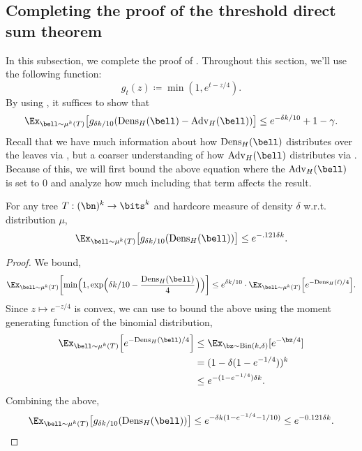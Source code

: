\documentclass[11pt]{article}
\newcommand{\Bin}{\mathrm{Bin}}
\newcommand{\Dens}{\mathrm{Dens}}
\newcommand{\Adv}{\mathrm{Adv}}
\DeclarePairedDelimiter\paren{(}{)}
\DeclarePairedDelimiter\bracket{[}{]}
\begin{document}
\subsection{Completing the proof of the threshold direct sum theorem}
\label{subsec:threshold-DPT-proof}
In this subsection, we complete the proof of . Throughout this section, we'll use the following function:
\begin{equation*}
    g_t(z) \coloneqq \min(1, e^{t - z/4}).
\end{equation*}
By using , it suffices to show that
\begin{equation}
    \label{eq:error-bound}
     \Ex_{\bell \sim \mu^k(T)}\bracket*{g_{\delta k/10}(\Dens_H(\bell) - \Adv_H(\bell))}  \leq e^{-\delta k/10} + 1-\gamma.
\end{equation}
Recall that we have much information about how $\Dens_H(\bell)$ distributes over the leaves via , but a coarser understanding of how $\Adv_H(\bell)$ distributes via . Because of this, we will first bound the above equation where the $\Adv_H(\bell)$ is set to $0$ and analyze how much including that term affects the result.
\begin{lemma}
    \label{lem:error-no-advantange}
    For any tree $T:(\bn)^k \to \bits^k$ and hardcore measure of density $\delta$ w.r.t. distribution $\mu$,
    \begin{equation*}
        \Ex_{\bell \sim \mu^k(T)}\bracket*{g_{\delta k/10}(\Dens_H(\bell))} \leq e^{-.121\delta k}.
    \end{equation*}
\end{lemma}
\begin{proof}
    We bound,
    \begin{equation*}
        \Ex_{\bell \sim \mu^k(T)}\bracket*{\min\paren[\Big]{1, \exp\paren[\Big]{\delta k / 10 - \frac{\Dens_H(\bell)}{4}}}} \leq e^{\delta k/10} \cdot \Ex_{\bell \sim \mu^k(T)}\bracket*{e^{-\Dens_H(\ell)/4}}.
    \end{equation*}
    Since $z \mapsto e^{-z/4}$ is convex, we can use  to bound the above using the moment generating function of the binomial distribution,
    \begin{align*}
         \Ex_{\bell \sim \mu^k(T)}\bracket*{e^{-\Dens_H(\bell)/4}} &\leq \Ex_{\bz \sim \Bin(k,\delta)}[e^{-\bz/4}] \\
         &= (1 - \delta(1 - e^{-1/4}))^k \\
         & \leq e^{-(1 -e^{-1/4})\delta k}.
    \end{align*}
    Combining the above,
    \begin{equation*}
         \Ex_{\bell \sim \mu^k(T)}\bracket*{g_{\delta k/10}(\Dens_H(\bell))}  \leq e^{-\delta k (1 - e^{-1/4} - 1/10)} \leq e^{-0.121 \delta k}. \qedhere
    \end{equation*}
\end{proof}
\end{document}

